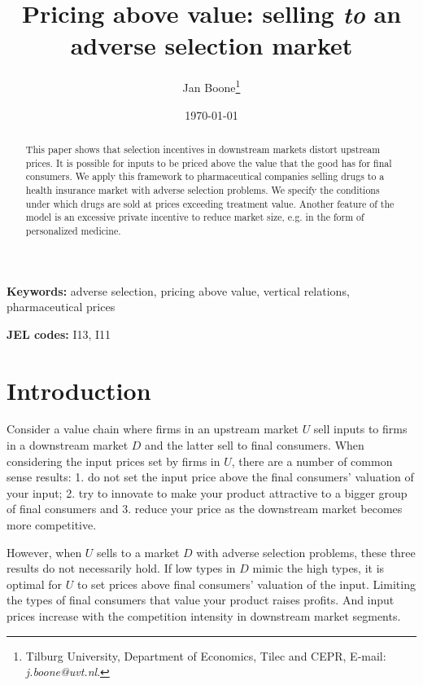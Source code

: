 \documentclass[a4paper,12pt]{article}
\author{Jan Boone\thanks{Tilburg University, Department of Economics, Tilec and CEPR, E-mail: \textit{j.boone@uvt.nl}.}}
\date{\today}
\title{Pricing above value: selling \emph{to} an adverse selection market}
\begin{document}
\maketitle
\maketitle
\begin{abstract}
This paper shows that selection incentives in downstream markets distort upstream prices. It is possible for inputs to be priced above the value that the good has for final consumers. We apply this framework to pharmaceutical companies selling drugs to a health insurance market with adverse selection problems. We specify the conditions under which drugs are sold at prices exceeding treatment value. Another feature of the model is an excessive private incentive to reduce market size, e.g. in the form of personalized medicine.
\end{abstract}

\textbf{Keywords:} adverse selection, pricing above value, vertical relations, pharmaceutical prices

\textbf{JEL codes:} I13, I11


\newpage

\section{Introduction}
\label{sec:orge276c13}

Consider a value chain where firms in an upstream market \(U\) sell inputs to firms in a downstream market \(D\) and the latter sell to final consumers. When considering the input prices set by firms in \(U\), there are a number of common sense results: 1. do not set the input price above the final consumers' valuation of your input; 2. try to innovate to make your product attractive to a bigger group of final consumers and 3. reduce your price as the downstream market becomes more competitive.

However, when \(U\) sells to a market \(D\) with adverse selection problems, these three results do not necessarily hold. If low types in \(D\) mimic the high types, it is optimal for \(U\) to set prices above final consumers' valuation of the input. Limiting the types of final consumers that value your product raises profits. And input prices increase with the competition intensity in downstream market segments.
\end{document}
